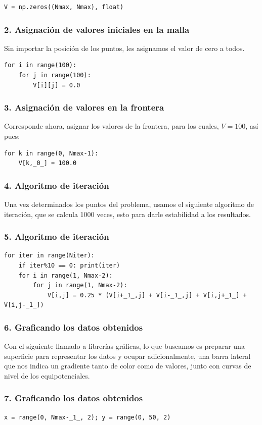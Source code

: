 \documentclass[12pt]{beamer}
\begin{document}
{\begin{frame}[fragile]
\begin{lstlisting}[caption=Construyendo la malla, style=FormattedNumber, basicstyle=\linespread{1.1}\ttfamily=\small, columns=fullflexible]
V = np.zeros((Nmax, Nmax), float)
\end{lstlisting}
\end{frame}
\begin{frame}[fragile]
\frametitle{2. Asignación de valores iniciales en la malla}
Sin importar la posición de los puntos, les asignamos el valor de cero a todos.
\begin{lstlisting}[basicstyle=\linespread{0.9}\ttfamily\small, columns=fullflexible]
for i in range(100):
    for j in range(100):
        V[i][j] = 0.0
\end{lstlisting}
\end{frame}
\begin{frame}[fragile]
\frametitle{3. Asignación de valores en la frontera}
Corresponde ahora, asignar los valores de la frontera, para los cuales, $V=100$, así pues:
\begin{lstlisting}[caption=Asignando los valores iniciales, style=FormattedNumber, basicstyle=\linespread{1.1}\ttfamily=\small, columns=fullflexible]
for k in range(0, Nmax-1):
    V[k,_0_] = 100.0
\end{lstlisting}
\end{frame}
\begin{frame}[fragile]
\frametitle{4. Algoritmo de iteración}
Una vez determinados los puntos del problema, usamos el siguiente algoritmo de iteración, que se calcula 1000 veces, esto para darle estabilidad a los resultados.
\end{frame}
\begin{frame}
\frametitle{5. Algoritmo de iteración}
\begin{lstlisting}[caption=Iteración en los puntos, style=FormattedNumber, basicstyle=\linespread{1.1}\ttfamily=\small, columns=fullflexible]
for iter in range(Niter):
    if iter%10 == 0: print(iter)
    for i in range(1, Nmax-2):
        for j in range(1, Nmax-2):
            V[i,j] = 0.25 * (V[i+_1_,j] + V[i-_1_,j] + V[i,j+_1_] + V[i,j-_1_])
\end{lstlisting}
\end{frame}
\begin{frame}[fragile]
\frametitle{6. Graficando los datos obtenidos}
Con el siguiente llamado a librerías gráficas, lo que buscamos es preparar una superficie para representar los datos y ocupar adicionalmente, una barra lateral que nos indica un gradiente tanto de color como de valores, junto con curvas de nivel de los equipotenciales.
\end{frame}
\begin{frame}
\frametitle{7. Graficando los datos obtenidos}
\begin{lstlisting}[caption=Graficando la solución, style=FormattedNumber, basicstyle=\linespread{1.1}\ttfamily=\small, columns=fullflexible]
x = range(0, Nmax-_1_, 2); y = range(0, 50, 2)


\end{lstlisting}
\end{frame}}
\end{document}
